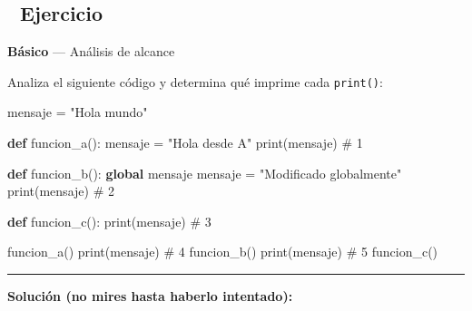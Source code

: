 \documentclass[
  doc,
  floatsintext,
  longtable,
  a4paper,
  nolmodern,
  notxfonts,
  notimes,
  12pt,
  colorlinks=true,linkcolor=blue,citecolor=blue,urlcolor=blue]{apa7}
\newenvironment{Shaded}{\begin{snugshade}}{\end{snugshade}}
\newcommand{\BuiltInTok}[1]{\textcolor[rgb]{0.00,0.23,0.31}{#1}}
\newcommand{\CommentTok}[1]{\textcolor[rgb]{0.37,0.37,0.37}{#1}}
\newcommand{\KeywordTok}[1]{\textcolor[rgb]{0.00,0.23,0.31}{\textbf{#1}}}
\newcommand{\NormalTok}[1]{\textcolor[rgb]{0.00,0.23,0.31}{#1}}
\newcommand{\OperatorTok}[1]{\textcolor[rgb]{0.37,0.37,0.37}{#1}}
\newcommand{\StringTok}[1]{\textcolor[rgb]{0.13,0.47,0.30}{#1}}
\begin{document}
\subsection{📝 Ejercicio}\label{ejercicio}

\textbf{Básico} --- Análisis de alcance

Analiza el siguiente código y determina qué imprime cada
\texttt{print()}:

\begin{Shaded}
\begin{Highlighting}[]
\NormalTok{mensaje }\OperatorTok{=} \StringTok{"Hola mundo"}

\KeywordTok{def}\NormalTok{ funcion\_a():}
\NormalTok{    mensaje }\OperatorTok{=} \StringTok{"Hola desde A"}
    \BuiltInTok{print}\NormalTok{(mensaje)  }\CommentTok{\# 1}

\KeywordTok{def}\NormalTok{ funcion\_b():}
    \KeywordTok{global}\NormalTok{ mensaje}
\NormalTok{    mensaje }\OperatorTok{=} \StringTok{"Modificado globalmente"}
    \BuiltInTok{print}\NormalTok{(mensaje)  }\CommentTok{\# 2}

\KeywordTok{def}\NormalTok{ funcion\_c():}
    \BuiltInTok{print}\NormalTok{(mensaje)  }\CommentTok{\# 3}

\NormalTok{funcion\_a()}
\BuiltInTok{print}\NormalTok{(mensaje)  }\CommentTok{\# 4}
\NormalTok{funcion\_b()}
\BuiltInTok{print}\NormalTok{(mensaje)  }\CommentTok{\# 5}
\NormalTok{funcion\_c()}
\end{Highlighting}
\end{Shaded}

\begin{center}\rule{0.5\linewidth}{0.5pt}\end{center}

\textbf{Solución (no mires hasta haberlo intentado):}
\end{document}
